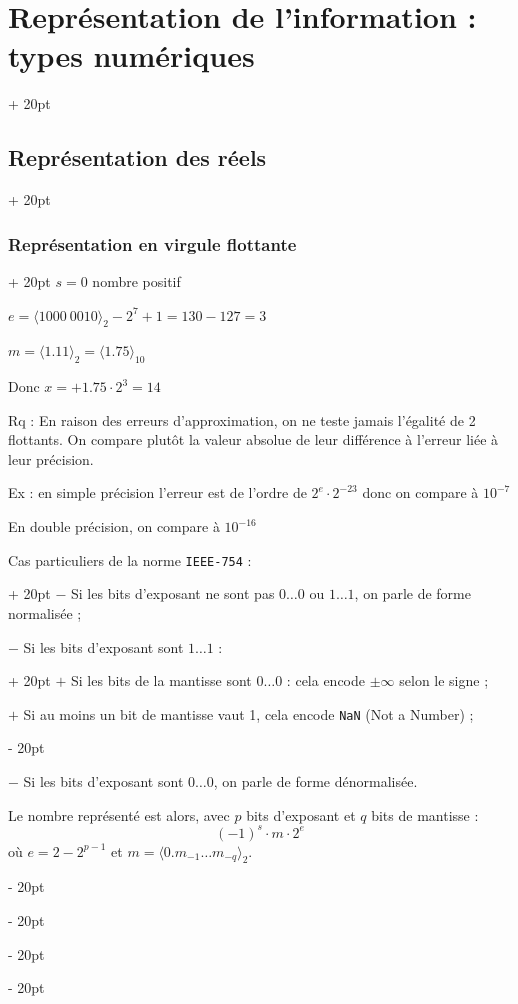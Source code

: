 \documentclass[a4paper, 12pt, twoside]{article}
\newcommand{\ind}[1][20pt]{\advance\leftskip + #1}
\newcommand{\deind}[1][20pt]{\advance\leftskip - #1}
\newenvironment{indentedenv}[1][20pt]{\par \ind[#1]}{\par \deind}
\newenvironment{indt}[2][20pt]{#2 \begin{indentedenv}[#1]}{\end{indentedenv}} %
\begin{document}
\begin{indt}{\section{Représentation de l'information : types numériques}}
\begin{indt}{\subsection{Représentation des réels}}
\begin{indt}{\subsubsection{Représentation en virgule flottante}}
                $s = 0$ nombre positif
                
                $e = \langle 1000\ 0010 \rangle_2 - 2^7 + 1 = 130 - 127 = 3$
                
                $m = \langle 1.11 \rangle_2 = \langle 1.75 \rangle_{10}$
                
                Donc $x = +1.75 \cdot 2^3 = 14$
                
                \vspace{12pt}
                
                Rq : En raison des erreurs d'approximation, on ne teste jamais l'égalité de 2 flottants. On compare plutôt la valeur absolue de leur différence à l'erreur liée à leur précision.
                
                Ex : en simple précision l'erreur est de l'ordre de $2^e \cdot 2^{-23}$ donc on compare à $10^{-7}$
                
                En double précision, on compare à $10^{-16}$
                
                \vspace{12pt}
                
                \begin{indt}{Cas particuliers de la norme \texttt{IEEE-754} :}
                    $-$ Si les bits d'exposant ne sont pas $0\ldots 0$ ou $1 \ldots 1$, on parle de forme normalisée ;
                    
                    \vspace{6pt}
                    
                    \begin{indt}{$-$ Si les bits d'exposant sont $1\ldots 1$ :}
                        $+$ Si les bits de la mantisse sont $0 \ldots 0$ : cela encode $\pm \infty$ selon le signe ;
                        
                        $+$ Si au moins un bit de mantisse vaut 1, cela encode \texttt{NaN} (Not a Number) ;
                    \end{indt}
                    
                    \vspace{6pt}
                    
                    $-$ Si les bits d'exposant sont $0 \ldots 0$, on parle de forme dénormalisée.
                    
                    Le nombre représenté est alors, avec $p$ bits d'exposant et $q$ bits de mantisse :
                    \[ (-1)^s \cdot m \cdot 2^e \]
                    où $e = 2 - 2^{p - 1}$ et $m = \langle 0.m_{-1}\ldots m_{-q} \rangle_2$.
                \end{indt}
            \end{indt}
        \end{indt}
        
    \end{indt}


    

    
    
\end{document}
